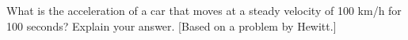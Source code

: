 What is the acceleration of a car that moves at a steady
velocity of 100 km/h for 100 seconds? Explain your answer.
[Based on a problem by Hewitt.]

